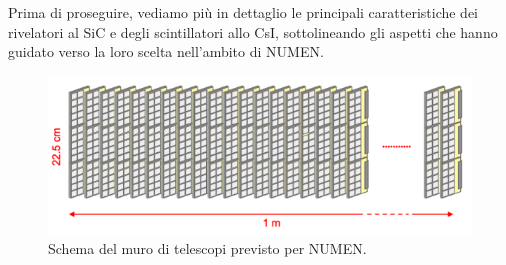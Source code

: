 Prima di proseguire, vediamo più in dettaglio le principali caratteristiche dei rivelatori al SiC e degli scintillatori allo CsI, sottolineando gli aspetti che  hanno guidato verso la loro scelta nell'ambito di NUMEN.


\begin{figure} [!t]
	\centering
	\includegraphics[width=\textwidth, keepaspectratio]{Grafici/muro_telescopi.png}
	\caption{Schema del muro di telescopi previsto per NUMEN.} \label{fig:muro_telescopi}
\end{figure}









\subsection{}


